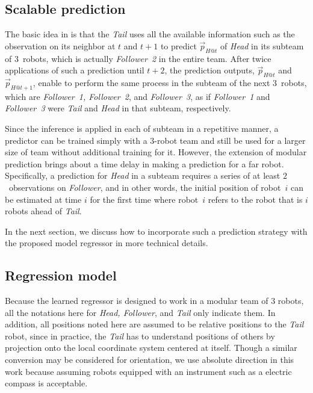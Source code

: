 \documentclass[letterpaper, 10 pt, conference]{ieeeconf}  %
\begin{document}
	\subsection{Scalable prediction} 
	\label{sec:scalable_prediction}
		
	The basic idea in \cite{CPR17} is that the \emph{Tail} uses all the available information 
	such as the observation on its neighbor
	at $t$ and $t+1$ to predict $\vec{p}_{H@t}$ of \emph{Head} in its subteam of $3$~robots, 
	which is actually \emph{Follower~2} in the entire team. 
	After twice applications of such a prediction until $t+2$, the prediction outputs, 
	$\vec{p}_{H@t}$ and $\vec{p}_{H@t+1}$, enable 
	to perform the same process in the subteam of the next $3$~robots, which are 
	\emph{Follower~1, Follower~2}, and \emph{Follower~3}, as if \emph{Follower~1} and 
	\emph{Follower~3} were \emph{Tail} and \emph{Head} in that subteam, respectively. 
	
	Since the inference is applied in each of subteam in a repetitive manner, 
	a predictor can be trained simply with a $3$-robot team and still be used for a larger 
	size of team without additional training for it. However, the extension of 
	modular prediction brings about a time delay in making a prediction for a far robot. 	
	Specifically, a prediction for \emph{Head} in a subteam requires a series of at least 
	$2$~observations on \emph{Follower}, and in other words, 
	the initial position of robot~$i$ can be estimated at time $i$ for the first time 
	where robot~$i$ refers to the robot that is $i$ robots ahead of \emph{Tail}.
	
	In the next section, we discuss how to incorporate such a prediction strategy with 
	the proposed model regressor in more technical details. 
		
		
	\subsection{Regression model}
	\label{sec:regression_model}
	
	Because the learned regressor is designed to work in a modular team of $3$ robots, 
	all the notations here for \emph{Head, Follower}, and \emph{Tail} only indicate
	them. In addition, all positions noted here are assumed to be relative positions 
	to the \emph{Tail} robot, since in practice, the \emph{Tail} has to understand 
	positions of others by projection onto the local coordinate system centered 
	at itself. Though a similar conversion may be considered for orientation, 
	we use absolute direction in this work because assuming robots equipped 
	with an instrument such as a electric compass is acceptable. 
	 
\end{document}
